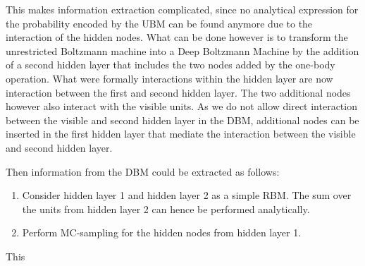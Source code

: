 \documentclass{article}
\begin{document}
This makes information extraction complicated, since no analytical expression
for the probability encoded by the UBM can be found anymore due to the
interaction of the hidden nodes. What can be done however is to transform the
unrestricted Boltzmann machine into a Deep Boltzmann Machine by the addition of
a second hidden layer that includes the two nodes added by the one-body
operation. What were formally interactions within the hidden layer are now
interaction between the first and second hidden layer. The two additional nodes
however also interact with the visible units. As we do not allow direct
interaction between the visible and second hidden layer in the DBM, additional
nodes can be inserted in the first hidden layer that mediate the interaction
between the visible and second hidden layer. \par
Then information from the DBM could be extracted as follows:
\begin{enumerate}
  \item Consider hidden layer 1 and hidden layer 2 as a simple RBM. The sum over
  the units from hidden layer 2 can hence be performed analytically.
  \item Perform MC-sampling for the hidden nodes from hidden layer 1.
\end{enumerate}
This  
\end{document}
